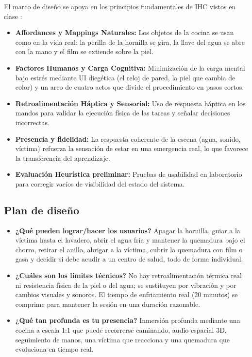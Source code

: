 \documentclass[11pt,letterpaper]{article}
\begin{document}
El marco de diseño se apoya en los principios fundamentales de IHC vistos en clase \cite{norman}:

\begin{itemize}
  \item \textbf{Affordances y Mappings Naturales:} Los objetos de la cocina se usan como en la vida real: la perilla de la hornilla se gira, la llave del agua se abre con la mano y el film se extiende sobre la piel.
  \item \textbf{Factores Humanos y Carga Cognitiva:} Minimización de la carga mental bajo estrés mediante UI diegética (el reloj de pared, la piel que cambia de color) y un arco de cuatro actos que divide el procedimiento en pasos cortos.
  \item \textbf{Retroalimentación Háptica y Sensorial:} Uso de respuesta háptica en los mandos para validar la ejecución física de las tareas y señalar decisiones incorrectas.
  \item \textbf{Presencia y fidelidad:} La respuesta coherente de la escena (agua, sonido, víctima) refuerza la sensación de estar en una emergencia real, lo que favorece la transferencia del aprendizaje.
  \item \textbf{Evaluación Heurística preliminar:} Pruebas de usabilidad en laboratorio para corregir vacíos de visibilidad del estado del sistema.
\end{itemize}

\subsection{Plan de diseño}

\begin{itemize}
  \item \textbf{¿Qué pueden lograr/hacer los usuarios?} Apagar la hornilla, guiar a la víctima hasta el lavadero, abrir el agua fría y mantener la quemadura bajo el chorro, retirar el anillo, abrigar a la víctima, cubrir la quemadura con film o gasa y decidir si debe acudir a un centro de salud, todo de forma individual.
  \item \textbf{¿Cuáles son los límites técnicos?} No hay retroalimentación térmica real ni resistencia física de la piel o del agua; se sustituyen por vibración y por cambios visuales y sonoros. El tiempo de enfriamiento real (20 minutos) se comprime para mantener la sesión en una duración razonable.
  \item \textbf{¿Qué tan profunda es tu presencia?} Inmersión profunda mediante una cocina a escala 1:1 que puede recorrerse caminando, audio espacial 3D, seguimiento de manos, una víctima que reacciona y una quemadura que evoluciona en tiempo real.
\end{itemize}
\end{document}
